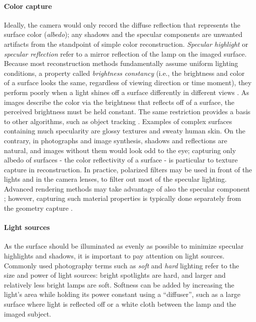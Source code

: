 \paragraph{Color capture}
Ideally, the camera would only record the diffuse reflection that represents the surface color (\emph{albedo});
any shadows and the specular components are unwanted artifacts from the standpoint of simple color reconstruction.
\emph{Specular highlight} or \emph{specular reflection} refer to a mirror reflection of the lamp on the imaged surface.
Because most reconstruction methods fundamentally assume uniform lighting conditions, a property called \emph{brightness constancy} (i.e., the brightness and color of a surface looks the same, regardless of viewing direction or time moment), they perform poorly when a light shines off a surface differently in different views \cite{szeliski10vision}.
As images describe the color via the brightness that reflects off of a surface, the perceived brightness must be held constant.
The same restriction provides a basis to other algorithms, such as object tracking \cite{horn1974determining,horn1981determining}.
Examples of complex surfaces containing much specularity are glossy textures and sweaty human skin.
On the contrary, in photographs and image synthesis, shadows and reflections are natural, and images without them would look odd to the eye; capturing only albedo of surfaces - the color reflectivity of a surface - is particular to texture capture in reconstruction.
In practice, polarized filters may be used in front of the lights and in the camera lenses, to filter out most of the specular lighting.
Advanced rendering methods may take advantage of also the specular component \cite{semedicaljuttu?}; however, capturing such material properties is typically done separately from the geometry capture \cite{aittala2013practical}.


\paragraph{Light sources}
As the surface should be illuminated as evenly as possible to minimize specular highlights and shadows, it is important to pay attention on light sources.
Commonly used photography terms such as \emph{soft} and \emph{hard} lighting refer to the size and power of light sources: bright spotlights are hard, and larger and relatively less bright lamps are soft.
Softness can be added by increasing the light's area while holding its power constant using a ``diffuser'', such as a large surface where light is reflected off or a white cloth between the lamp and the imaged subject.
\cite[p. 108]{langford2000basic}

